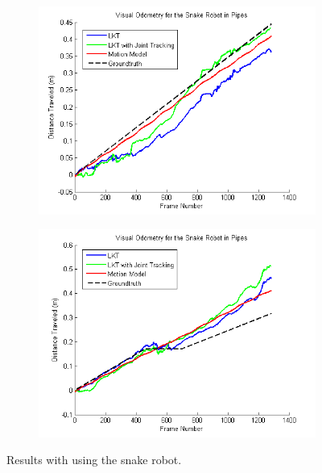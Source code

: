 \documentclass[letterpaper, 10 pt, conference]{ieeeconf}
\begin{document}
\begin{figure}[tb]
	\centering
	\begin{subfigure}{\columnwidth}
		  \centering
		  \includegraphics[width=\columnwidth]{trial8_results.png}
		  \label{snakes:trial8}
	\end{subfigure}
	\begin{subfigure}{\columnwidth}
		  \centering
		  \includegraphics[width=\columnwidth]{trial9_results.png}
		  \label{snakes:trial9}
	\end{subfigure}
	\caption{Results with using the snake robot.}
    \label{snakes}
\end{figure}
\end{document}
